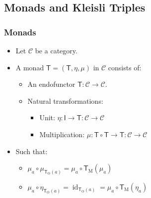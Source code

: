 \documentclass{beamer}
\DeclareMathOperator{\obj}{O}
\DeclareMathOperator{\mor}{M}
\DeclareMathOperator{\id}{id}
\newcommand{\idO}[1]{\natO{\id}{#1}}
\newcommand{\comp}{\ensuremath{\mathrel{\circ}}}
\newcommand{\cat}[1]{\ensuremath{\mathcal{#1}}}
\newcommand{\func}[1]{\ensuremath{\mathsf{#1}}}
\newcommand{\funcO}[1]{\ensuremath{\func{#1}_{\obj}}}
\newcommand{\funcM}[1]{\ensuremath{\func{#1}_{\mor}}}
\newcommand{\nat}[1]{\ensuremath{#1}}
\newcommand{\natO}[2]{\ensuremath{\nat{#1}_{#2}}}
\newcommand{\mon}[1]{\func{#1}}
\begin{document}

\subsection{Monads and Kleisli Triples}


\begin{frame}
  \frametitle{Monads}

  \begin{definition}[Monad]
    \begin{itemize}
    \item
      Let \cat{C} be a category.
    \item
      A monad $\mon{T} = (\func{T}, \nat{\eta}, \nat{\mu})$ in \cat{C}
      consists of:
      \begin{itemize}
      \item
        An endofunctor $\func{T}: \cat{C} \to \cat{C}$.
      \item
        Natural transformations:
        \begin{itemize}
        \item
          Unit: $\nat{\eta}: \func{I} \to \func{T}: \cat{C} \to
          \cat{C}$
        \item
          Multiplication: $\nat{\mu}: \func{T \comp T} \to \func{T}:
          \cat{C} \to \cat{C}$
        \end{itemize}
      \end{itemize}
    \item
      Such that:
      \begin{itemize}
      \item
        $\natO{\mu}{a} \comp \natO{\mu}{\funcO{T}(a)} = \natO{\mu}{a}
        \comp \funcM{T}(\natO{\mu}{a})$
      \item
        $\natO{\mu}{a} \comp \natO{\eta}{\funcO{T}(a)} =
        \idO{\funcO{T}(a)} = \natO{\mu}{a} \comp
        \funcM{T}(\natO{\eta}{a})$
      \end{itemize}
    \end{itemize}
  \end{definition}

\end{frame}

\end{document}
